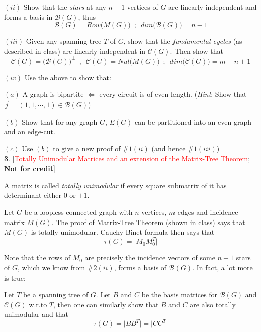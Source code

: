 \documentclass[10pt]{article}
\begin{document}
$(ii)$ Show that the \emph{stars} at any $n-1$ vertices of $G$ are linearly independent and forms a basis in $\mathcal{B}(G)$, thus $$\mathcal{B}(G)=Row\big(M(G)\big)\,\,\,; \,\,\, dim\big(\mathcal{B}(G)\big)=n-1$$

$(iii)$ Given any spanning tree $T$ of $G$, show that the \emph{fundamental cycles} (as described in class) are linearly independent in $\mathcal{C}(G)$. Then show that $$\mathcal{C}(G)=\big(\mathcal{B}(G)\big)^{\perp}\,\,\,, \,\,\,\mathcal{C}(G)=Nul\big(M(G)\big)\,\,\,; \,\,\, dim\big(\mathcal{C}(G)\big)=m-n+1$$

$(iv)$ Use the above to show that:\smallskip

\hspace{0.25 in} $(a)$ A graph is bipartite $\iff$ every circuit is of even length. \big(\emph{Hint}: Show that $\overrightarrow{j}=(1,1,\cdots, 1)\in \mathcal{B}(G)$\big)\smallskip

\hspace{0.25 in} $(b)$ Show that for any graph $G$, $E(G)$ can be partitioned into an even graph and an edge-cut.\smallskip

\hspace{0.25 in} $(c)$ Use $(b)$ to give a new proof of $\# 1(ii)$ (and hence $\# 1(iii)$)\\

\textbf{3}. [\textcolor{red}{Totally Unimodular Matrices and an extension of the Matrix-Tree Theorem}; \textbf{Not for credit}]\medskip

A matrix is called \emph{totally unimodular} if every square submatrix of it has determinant either $0$ or $\pm 1$.\smallskip

Let $G$ be a loopless connected graph with $n$ vertices, $m$ edges and incidence matrix $M(G)$. The proof of Matrix-Tree Theorem (shown in class) says that $M(G)$ is totally unimodular. Cauchy-Binet formula then says that $$\tau(G)=\big|M_0M_0^T\big|$$

Note that the rows of $M_0$ are precisely the incidence vectors of some $n-1$ stars of $G$, which we know from $\# 2(ii)$, forms a basis of $\mathcal{B}(G)$. In fact, a lot more is true:\smallskip

Let $T$ be a spanning tree of $G$. Let $B$ and $C$ be the basis matrices for $\mathcal{B}(G)$ and $\mathcal{C}(G)$ w.r.to $T$, then one can similarly show that $B$ and $C$ are also totally unimodular and that $$\tau(G)=\big|BB^T\big|=\big|CC^T\big|$$

\end{document}
